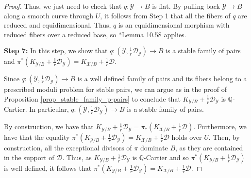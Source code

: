 \documentclass{amsart}
\newcommand{\cD}{\mathcal{D}}
\newcommand{\cX}{\mathcal{X}}
\newcommand{\cY}{\mathcal{Y}}
\theoremstyle{definition}
\newcommand{\rar}{\rightarrow}
\begin{document}
\begin{proof}
Thus, we just need to check that $q \colon \cY\to B$ is flat.
By pulling back $\cY\to B$ along a smooth curve through $U$, it follows from Step 1 that all the fibers of $q$ are reduced and equidimensional.
Thus, $q$ is an equidimensional morphism with reduced fibers over a reduced base, so \cite{kol_new}*{Lemma 10.58} applies.

{\bf Step 7:} In this step, we show that $q \colon (\cY,\frac{1}{r}\cD_\cY) \rar B$ is a stable family of pairs and $\pi^*(K_{\cY/B} + \frac{1}{r}\cD_{\cY}) = K_{\cX/B} + \frac{1}{r}\cD$.

Since $q \colon (\cY,\frac{1}{r}\cD_\cY) \rar B$ is a well defined family of pairs and its fibers belong to a prescribed moduli problem for stable pairs, we can argue as in the proof of Proposition \ref{prop_stable_family_p-pairs} to conclude that $K_{\cY/B} + \frac{1}{r}\cD_{\cY}$ is $\mathbb Q$-Cartier.
In particular, $q \colon (\cY,\frac{1}{r}\cD_\cY) \rar B$ is a stable family of pairs.

By construction, we have that $K_{\cY/B} + \frac{1}{r}\cD_{\cY} =\pi_*( K_{\cX/B} + \frac{1}{r}\cD)$.
Furthermore, we have that the equality $\pi^*(K_{\cY/B} + \frac{1}{r}\cD_{\cY}) = K_{\cX/B} + \frac{1}{r}\cD$ holds over $U$.
Then, by construction, all the exceptional divisors of $\pi$ dominate $B$, as they are contained in the support of $\cD$.
Thus, as $K_{\cY/B} + \frac{1}{r}\cD_{\cY}$ is $\mathbb Q$-Cartier and so $\pi^*(K_{\cY/B} + \frac{1}{r}\cD_{\cY})$ is well defined, it follows that $\pi^*(K_{\cY/B} + \frac{1}{r}\cD_{\cY}) = K_{\cX/B} + \frac{1}{r}\cD$.
\end{proof}
\end{document}
